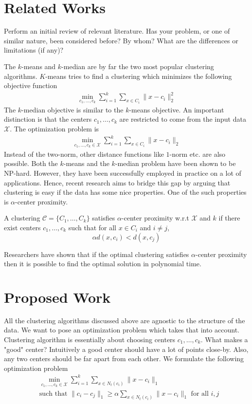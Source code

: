 \documentclass{article}
\newcommand{\mc}{\mathcal}
\begin{document}
\section{Related Works}
Perform an initial review of relevant literature. Has your problem, or one of similar nature, been considered before? By whom? What are the differences or limitations (if any)? 

The $k$-means and $k$-median are by far the two most popular clustering algorithms. $K$-means tries to find a clustering which minimizes the following objective function
\begin{align*}
	\min_{c_1, \ldots, c_k} \sum_{i=1}^k \sum_{x \in C_i} \|x-c_i\|_2^2 
\end{align*}
The $k$-median objective is similar to the $k$-means objective. An important distinction is that the centers $c_1, \ldots, c_k$ are restricted to come from the input data $\mc X$. The optimization problem is
\begin{align*}
	\min_{c_1, \ldots, c_k \in \mc X} \sum_{i=1}^k \sum_{x \in C_i} \|x-c_i\|_2 
\end{align*}
Instead of the two-norm, other distance functions like $1$-norm etc. are also possible. Both the $k$-means and the $k$-median problem have been shown to be NP-hard. However, they have been successfully employed in practice on a lot of applications. Hence, recent research aims to bridge this gap by arguing that clustering is easy if the data has some nice properties. One of the such properties is $\alpha$-center proximity. 

A clustering $\mc C = \{C_1, \ldots, C_k\}$ satisfies $\alpha$-center proximity w.r.t $\mc X$ and $k$ if there exist centers $c_1, \ldots, c_k$  such that for all $x \in C_i$ and $i\neq j$, $$\alpha d(x, c_i) < d(x, c_j)$$

Researchers have shown that if the optimal clustering satisfies $\alpha$-center proximity then it is possible to find the optimal solution in polynomial time. 
\section{Proposed Work}
All the clustering algorithms discussed above are agnostic to the structure of the data. We want to pose an optimization problem which takes that into account. Clustering algorithm is essentially about choosing centers $c_1, \ldots, c_k$. What makes a "good" center? Intuitively a good center should have a lot of points close-by. Also, any two centers should be far apart from each other. We formulate the following optimization problem
\begin{align*}
	&\min_{c_1, \ldots, c_k \in \mc X} \sum_{i=1}^k \sum_{x \in N_t(c_i)} \|x-c_i\|_1 \\
	& \text{such that } \|c_i - c_j\|_1 \ge \alpha  \sum_{x \in N_t(c_i)} \|x-c_i\|_1 \text{ for all }i, j
\end{align*}
\end{document}
